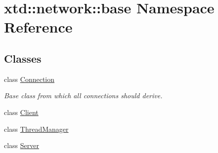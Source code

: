 \hypertarget{namespacextd_1_1network_1_1base}{\section{xtd\-:\-:network\-:\-:base Namespace Reference}
\label{namespacextd_1_1network_1_1base}
}
\subsection*{Classes}
\begin{DoxyCompactItemize}
\item 
class \hyperlink{classxtd_1_1network_1_1base_1_1Connection}{Connection}
\begin{DoxyCompactList}\small\item\em Base class from which all connections should derive. \end{DoxyCompactList}\item 
class \hyperlink{classxtd_1_1network_1_1base_1_1Client}{Client}
\item 
class \hyperlink{classxtd_1_1network_1_1base_1_1ThreadManager}{Thread\-Manager}
\item 
class \hyperlink{classxtd_1_1network_1_1base_1_1Server}{Server}
\end{DoxyCompactItemize}
